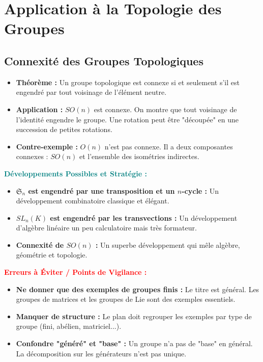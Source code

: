 \documentclass[12pt, a4paper, parskip=full]{report}
\theoremstyle{agregstyle}
\newenvironment{developpements}
  {\par\medskip\noindent\begin{oframed}\noindent\textbf{\textcolor{teal}{Développements Possibles et Stratégie :}}}
  {\end{oframed}\par\medskip}
\newenvironment{erreurs}
  {\par\medskip\noindent\begin{oframed}\noindent\textbf{\textcolor{red}{Erreurs à Éviter / Points de Vigilance :}}}
  {\end{oframed}\par\medskip}
\begin{document}
\section{Application à la Topologie des Groupes}
\subsection{Connexité des Groupes Topologiques}
\begin{itemize}
    \item \textbf{Théorème :} Un groupe topologique est connexe si et seulement s'il est engendré par tout voisinage de l'élément neutre.
    \item \textbf{Application :} $SO(n)$ est connexe. On montre que tout voisinage de l'identité engendre le groupe. Une rotation peut être "découpée" en une succession de petites rotations.
    \item \textbf{Contre-exemple :} $O(n)$ n'est pas connexe. Il a deux composantes connexes : $SO(n)$ et l'ensemble des isométries indirectes.
\end{itemize}

\begin{developpements}
    \begin{itemize}
        \item \textbf{$\mathfrak{S}_n$ est engendré par une transposition et un $n$-cycle :} Un développement combinatoire classique et élégant.
        \item \textbf{$SL_n(K)$ est engendré par les transvections :} Un développement d'algèbre linéaire un peu calculatoire mais très formateur.
        \item \textbf{Connexité de $SO(n)$ :} Un superbe développement qui mêle algèbre, géométrie et topologie.
    \end{itemize}
\end{developpements}

\begin{erreurs}
    \begin{itemize}
        \item \textbf{Ne donner que des exemples de groupes finis :} Le titre est général. Les groupes de matrices et les groupes de Lie sont des exemples essentiels.
        \item \textbf{Manquer de structure :} Le plan doit regrouper les exemples par type de groupe (fini, abélien, matriciel...).
        \item \textbf{Confondre "généré" et "base" :} Un groupe n'a pas de "base" en général. La décomposition sur les générateurs n'est pas unique.
    \end{itemize}
\end{erreurs}
\end{document}
